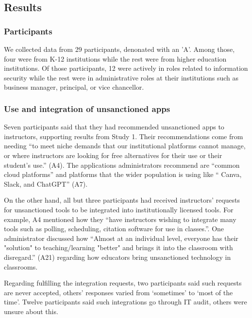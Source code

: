 
\subsection{Results}
\subsubsection{Participants}
We collected data from 29 participants, denonated with an 'A'. Among those, four were from K-12 institutions while the rest were from higher education institutions. Of those participants, 12 were actively in roles related to information security while the rest were in administrative roles at their institutions such as business manager, principal, or vice chancellor.

\subsubsection{Use and integration of unsanctioned apps}
Seven participants said that they had recommended unsanctioned apps to instructors, supporting results from Study 1. Their recommendations come from needing ``to meet niche demands that our institutional platforms cannot manage, or where instructors are looking for free alternatives for their use or their student's use.'' (A4). The applications administrators recommend are ``common cloud platforms'' and platforms that the wider population is using like `` Canva, Slack, and ChatGPT'' (A7).

On the other hand, all but three participants had received instructors' requests for unsanctioned tools to be integrated into institutionally licensed tools. %
For example, A4 mentioned how they ``have instructors wishing to integrate many tools such as polling, scheduling, citation software for use in classes.''.  One administrator discussed how ``Almost at an individual level, everyone has their "solution" to teaching/learning "better" and brings it into the classroom with disregard.'' (A21) regarding how educators bring unsanctioned technology in classrooms. 

Regarding fulfilling the integration requests, two participants said such requests are never accepted, others' responses varied from `sometimes' to `most of the time'. Twelve participants said such integrations go through IT audit, others were unsure about this.

